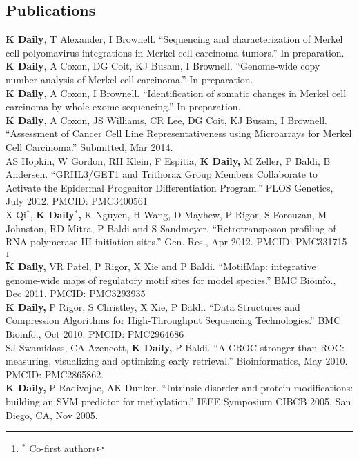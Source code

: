\documentclass[margin,line]{res}
\begin{document}
\begin{resume}
\section{\sc Publications}
\textbf{K Daily}, T Alexander, I Brownell. ``Sequencing and characterization of Merkel cell polyomavirus integrations in Merkel cell carcinoma tumors.'' In preparation.\\
\textbf{K Daily}, A Coxon, DG Coit, KJ Busam, I Brownell. ``Genome-wide copy number analysis of Merkel cell carcinoma.'' In preparation.\\
\textbf{K Daily}, A Coxon, I Brownell. ``Identification of somatic changes in Merkel cell carcinoma by whole exome sequencing.'' In preparation.\\
\textbf{K Daily}, A Coxon, JS Williams, CR Lee, DG Coit, KJ Busam, I Brownell. ``Assessment of Cancer Cell Line Representativeness using Microarrays for Merkel Cell Carcinoma.'' Submitted, Mar 2014. \\
AS Hopkin, W Gordon, RH Klein, F Espitia, \textbf{K Daily,} M Zeller, P Baldi, B Andersen. ``GRHL3/GET1 and Trithorax Group Members Collaborate to Activate the Epidermal Progenitor Differentiation Program.'' PLOS Genetics, July 2012. PMCID: PMC3400561\\
X Qi$^*$, \textbf{K Daily$^*$,} K Nguyen, H Wang, D Mayhew, P Rigor, S Forouzan, M Johnston, RD Mitra, P Baldi and S Sandmeyer. ``Retrotransposon profiling of RNA polymerase III initiation sites.'' Gen. Res., Apr 2012. PMCID: PMC331715 \let\thefootnote\relax\footnote{$^*$ Co-first authors} \\
\textbf{K Daily,} VR Patel, P Rigor, X Xie and P Baldi. ``MotifMap: integrative genome-wide maps of regulatory motif sites for model species.'' BMC Bioinfo., Dec 2011. PMCID: PMC3293935\\
\textbf{K Daily,} P Rigor, S Christley, X Xie, P Baldi. ``Data Structures and Compression Algorithms for High-Throughput Sequencing Technologies.'' BMC Bioinfo., Oct 2010. PMCID: PMC2964686\\
SJ Swamidass, CA Azencott, \textbf{K Daily,} P Baldi. ``A CROC stronger than ROC: measuring, visualizing and optimizing early retrieval.'' Bioinformatics, May 2010. PMCID: PMC2865862.\\
\textbf{K Daily,} P Radivojac, AK Dunker. ``Intrinsic disorder and protein modifications: building an SVM predictor for methylation.'' IEEE Symposium CIBCB 2005, San Diego, CA, Nov 2005.


\end{resume}
\end{document}
